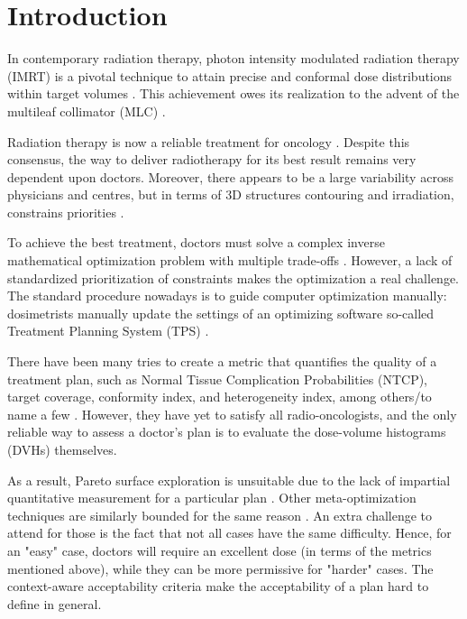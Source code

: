\section{Introduction}
In contemporary radiation therapy, photon intensity modulated radiation therapy (IMRT) is a pivotal technique to attain precise and conformal dose distributions within target volumes \cite{xu_comparison_2017}.
This achievement owes its realization to the advent of the multileaf collimator (MLC) \cite{galvin_characterization_1993}.

Radiation therapy is now a reliable treatment for oncology \cite{valentini_survival_2009}.
Despite this consensus, the way to deliver radiotherapy for its best result remains very dependent upon doctors.
Moreover, there appears to be a large variability across physicians and centres, but in terms of 3D structures contouring and irradiation, constrains priorities \cite{variability_2021}.

To achieve the best treatment, doctors must solve a complex inverse mathematical optimization problem with multiple trade-offs \cite{oelfke_inverse_2001} \cite{webb_physical_2003}.
However, a lack of standardized prioritization of constraints makes the optimization a real challenge.
The standard procedure nowadays is to guide computer optimization manually: dosimetrists manually update the settings of an optimizing software so-called Treatment Planning System (TPS) \cite{planification_website}.

There have been many tries to create a metric that quantifies the quality of a treatment plan, such as Normal Tissue Complication Probabilities (NTCP), target coverage, conformity index, and heterogeneity index, among others/to name a few \cite{lyman_normal_1992} \cite{li_input_2022}\label{metrics}.
However, they have yet to satisfy all radio-oncologists, and the only reliable way to assess a doctor's plan is to evaluate the dose-volume histograms (DVHs) themselves.

As a result, Pareto surface exploration is unsuitable due to the lack of impartial quantitative measurement for a particular plan \cite{huang_pareto_2021}.
Other meta-optimization techniques are similarly bounded for the same reason \cite{wu_optimization_2001} \cite{xing_optimization_1999}.
An extra challenge to attend for those is the fact that not all cases have the same difficulty.
Hence, for an "easy" case, doctors will require an excellent dose (in terms of the metrics mentioned above), while they can be more permissive for "harder" cases.
The context-aware acceptability criteria make the acceptability of a plan hard to define in general.

